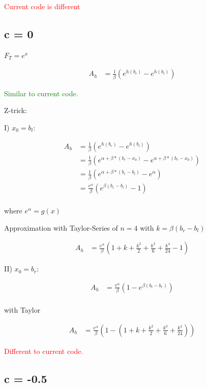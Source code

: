 \documentclass[]{article}
\begin{document}
\textcolor{red}{Current code is different}

\subsection{c = 0}

$F_T = e^x$

\begin{align*}
A_h &= \frac{1}{\beta} \left( e^{h(b_r)} - e^{h(b_l)} \right)
\end{align*}

\textcolor{green}{Similar to current code.}

Z-trick:

I) $x_0 = b_l$:

\begin{align*}
A_h &= \frac{1}{\beta} \left( e^{h(b_r)} - e^{h(b_l)} \right) \\
&= \frac{1}{\beta} \left( e^{\alpha + \beta * (b_r - x_0)} - e^{\alpha + \beta * (b_r - x_0)} \right) \\
&= \frac{1}{\beta} \left( e^{\alpha + \beta * (b_r - b_l)} - e^{\alpha} \right) \\
&=\frac{e^{\alpha}}{\beta} \left( e^{\beta (b_r - b_l)} - 1 \right) \\
\end{align*}

where $e^{\alpha} = g(x)$

Approximation with Taylor-Series of $n = 4$ with $k = \beta (b_r - b_l)$

\begin{align*}
A_h &= \frac{e^{\alpha}}{\beta} \left(1 + k + \frac{k^2}{2} +  \frac{k^3}{6} + \frac{k^4}{24} - 1 \right)
\end{align*}

II) $x_0 = b_r$:

\begin{align*}
A_h &=\frac{e^{\alpha}}{\beta} \left(1 - e^{\beta (b_l - b_r)}\right) \\
\end{align*}

with Taylor

\begin{align*}
A_h &= \frac{e^{\alpha}}{\beta} \left(1 - \left(1 + k + \frac{k^2}{2} +  \frac{k^3}{6} + \frac{k^4}{24} \right) \right)
\end{align*}

\textcolor{red}{Different to current code.}

\subsection{c = -0.5}
\end{document}
